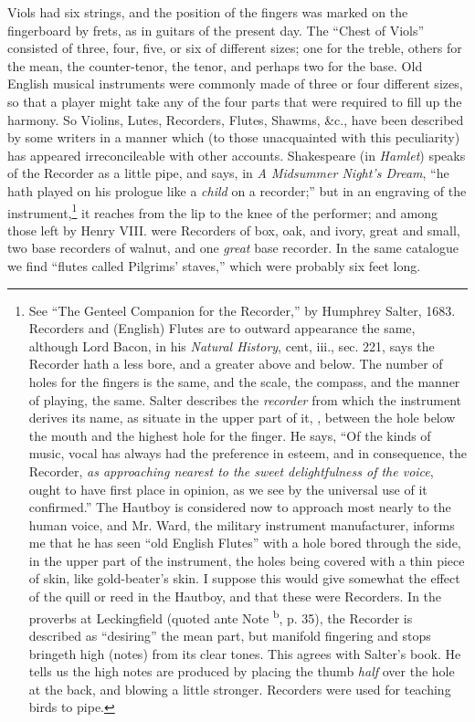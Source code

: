 Viols had six strings, and the position of the fingers was marked on the fingerboard
by frets, as in guitars of the present day. The “Chest of Viols” consisted
of three, four, five, or six of different sizes; one for the treble, others for the mean,
the counter-tenor, the tenor, and perhaps two for the base. Old English musical
instruments were commonly made of three or four different sizes, so that a player
might take any of the four parts that were required to fill up the harmony. So
Violins, Lutes, Recorders, Flutes, Shawms, \&c., have been described by some
writers in a manner which (to those unacquainted with this peculiarity) has
appeared irreconcileable with other accounts. Shakespeare (in \textit{Hamlet}) speaks of
the Recorder as a little pipe, and says, in \textit{A Midsummer Night's Dream}, “he hath
played on his prologue like a \textit{child} on a recorder;” but in an engraving of the
instrument,\footnote{\textit{}
See “The Genteel Companion for the Recorder,” by
Humphrey Salter, 1683. Recorders and (English) Flutes
are to outward appearance the same, although Lord Bacon,
in his \textit{Natural History}, cent, iii., sec. 221, says the Recorder
hath a less bore, and a greater above and below.
The number of holes for the fingers is the same, and the
scale, the compass, and the manner of playing, the same.
Salter describes the \textit{recorder} from which the instrument
derives its name, as situate in the upper part of it, \ie,
between the hole below the mouth and the highest hole
for the finger. He says, “Of the kinds of music, vocal
has always had the preference in esteem, and in consequence, 
the Recorder, \textit{as approaching nearest to the
sweet delightfulness of the voice}, ought to have first place
in opinion, as we see by the universal use of it confirmed.”
The Hautboy is considered now to approach most nearly
to the human voice, and Mr. Ward, the military instrument
manufacturer, informs me that he has seen “old
English Flutes” with a hole bored through the side, in
the upper part of the instrument, the holes being covered
with a thin piece of skin, like gold-beater's skin. I suppose
this would give somewhat the effect of the quill or
reed in the Hautboy, and that these were Recorders. In
the proverbs at Leckingfield (quoted ante Note \textsuperscript{b}, p. 35),
the Recorder is described as “desiring” the mean part,
but manifold fingering and stops bringeth high (notes)
from its clear tones. This agrees with Salter’s book. He
tells us the high notes are produced by placing the thumb
\textit{half} over the hole at the back, and blowing a little stronger.
Recorders were used for teaching birds to pipe.}%
it reaches from the lip to the knee of the performer; and among
those left by Henry VIII. were Recorders of box, oak, and ivory, great and small,
two base recorders of walnut, and one \textit{great} base recorder. In the same catalogue
we find “flutes called Pilgrims’ staves,” which were probably six feet long.


